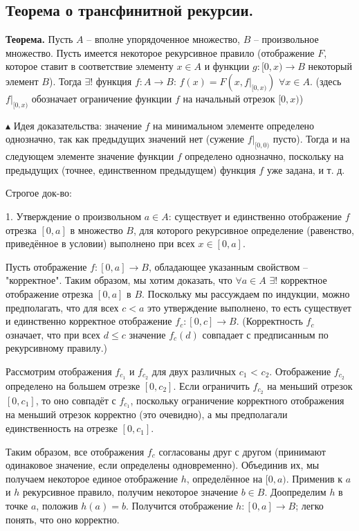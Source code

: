 \subsection{Теорема о трансфинитной рекурсии.}

\textbf{Теорема.} Пусть $A$ -- вполне упорядоченное множество, $B$ -- произвольное множество. Пусть имеется некоторое рекурсивное правило (отображение $F$, которое ставит в соответствие элементу $x \in A$ и функции $g : [0, x) \rightarrow B$ некоторый элемент $B$). Тогда $\exists !$ функция $f : A \rightarrow B$: $f(x) = F(x, f|_{[0,x)})$ $\forall x \in A$. (здесь $f|_{[0,x)}$ обозначает ограничение функции $f$ на начальный отрезок $[0, x)$)

$\blacktriangle$
Идея доказательства: значение $f$ на минимальном элементе определено однозначно, так как предыдущих значений нет (сужение $f|_{[0,0)}$ пусто). Тогда и на следующем элементе значение функции $f$ определено однозначно, поскольку на предыдущих (точнее, единственном предыдущем) функция $f$ уже задана, и т. д.

Строгое док-во:

1. Утверждение о произвольном $a \in A$: существует и единственно отображение $f$ отрезка $[0, a]$ в множество $B$, для которого рекурсивное определение (равенство, приведённое в условии) выполнено при всех $x \in [0, a]$.

Пусть отображение $f : [0, a] \rightarrow B$, обладающее указанным свойством -- "корректное". Таким образом, мы хотим доказать, что $\forall a \in A$ $\exists!$ корректное отображение отрезка $[0, a]$ в $B$. Поскольку мы рассуждаем по индукции, можно предполагать, что для всех $c < a$ это утверждение выполнено, то есть существует и единственно корректное отображение $f_c : [0, c] \rightarrow B$. (Корректность $f_c$ означает, что при всех $d \leqslant c$ значение $f_c(d)$ совпадает с предписанным по рекурсивному правилу.)

Рассмотрим отображения $f_{c_1}$ и $f_{c_2}$ для двух различных $c_1$ < $c_2$. Отображение $f_{c_2}$ определено на большем отрезке $[0, c_2]$. Если ограничить $f_{c_2}$ на меньший отрезок $[0, c_1]$, то оно совпадёт с $f_{c_1}$, поскольку ограничение корректного отображения на меньший отрезок корректно (это очевидно), а мы предполагали единственность на отрезке $[0, c_1]$.

Таким образом, все отображения $f_c$ согласованы друг с другом (принимают одинаковое значение, если определены одновременно). Объединив их, мы получаем некоторое единое отображение $h$, определённое на $[0, a)$. Применив к $a$ и $h$ рекурсивное правило, получим некоторое значение $b \in B$. Доопределим $h$ в точке $a$, положив $h(a) = b$. Получится отображение $h: [0, a] \rightarrow B$; легко понять, что оно корректно.


